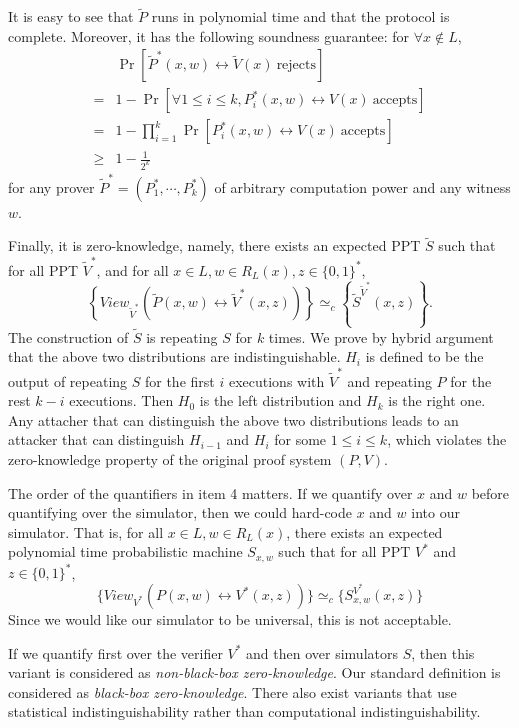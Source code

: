 It is easy to see that $\tilde P$ runs in polynomial time and that the protocol is complete.
Moreover, it has the following soundness guarantee:
for $\forall x \notin L$,
\begin{align*}
& \Pr \left[\tilde P^*(x,w) \leftrightarrow \tilde V(x) \ \text{rejects}\right]\\
= & 1- \Pr \left[\forall 1\leq i\leq k, P^*_i(x,w) \leftrightarrow V(x) \ \text{accepts}\right] \\
= & 1- \prod_{i=1}^k \Pr \left[P^*_i(x,w) \leftrightarrow V(x) \ \text{accepts}\right] \\
\geq& 1-\frac{1}{2^k}
\end{align*}
for any prover $\tilde P^*=(P^*_1, \cdots, P^*_k)$ of arbitrary computation power and any witness $w$.

Finally, it  is zero-knowledge, namely, there exists an expected PPT $\tilde S$ such that for all PPT $\tilde V^*$, and for all $x \in L, w \in R_L (x), z \in \{ 0, 1 \}^*$,
$$\left\{ View_{\tilde V^*} (\tilde P(x,w) \leftrightarrow \tilde V^* (x,z)) \right\} \simeq_c \left\{ \tilde S^{\tilde V^*} (x,z) \right\}.$$
The construction of $\tilde S$ is repeating $S$ for $k$ times. We prove by hybrid argument that the above two distributions are indistinguishable. $H_i$ is defined to be the output of repeating $S$ for the first $i$ executions with $\tilde V^*$ and repeating $P$ for the rest $k-i$ executions. Then $H_0$ is the left distribution and $H_k$ is the right one. Any attacher that can distinguish the above two distributions leads to an attacker that can distinguish $H_{i-1}$ and $H_{i}$ for some $1\leq i \leq k$, which violates the zero-knowledge property of the original proof system $(P,V)$.


\bigskip
The order of the quantifiers in item 4 matters.
If we quantify over $x$ and $w$ before quantifying over the simulator,
then we could hard-code  $x$ and $w$ into our simulator. That is, for all $x \in L, w \in R_L (x)$, there exists an expected polynomial time probabilistic machine $S_{x,w}$ such that for all PPT $V^*$ and $z \in \{ 0, 1 \}^*$,
$$\{ View_{V^*} (P(x,w) \leftrightarrow V^* (x,z)) \} \simeq_c \{ S_{x,w}^{V^*} (x,z) \} $$
Since we would like our simulator to be universal,  this is not acceptable.

If we quantify first over the verifier $V^*$ and then over simulators $S$, then this variant is considered as \emph{non-black-box zero-knowledge}. Our standard definition is considered as \emph{black-box zero-knowledge}. There  also exist variants that use statistical indistinguishability rather than computational indistinguishability.


